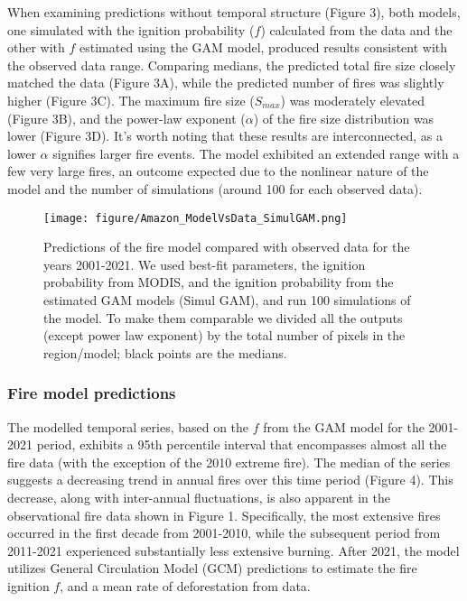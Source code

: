 \documentclass[
]{article}
\begin{document}
When examining predictions without temporal structure (Figure 3), both
models, one simulated with the ignition probability (\(f\)) calculated
from the data and the other with \(f\) estimated using the GAM model,
produced results consistent with the observed data range. Comparing
medians, the predicted total fire size closely matched the data (Figure
3A), while the predicted number of fires was slightly higher (Figure
3C). The maximum fire size (\(S_{max}\)) was moderately elevated (Figure
3B), and the power-law exponent (\(\alpha\)) of the fire size
distribution was lower (Figure 3D). It's worth noting that these results
are interconnected, as a lower \(\alpha\) signifies larger fire events.
The model exhibited an extended range with a few very large fires, an
outcome expected due to the nonlinear nature of the model and the number
of simulations (around 100 for each observed data).

\begin{figure}
\centering
\texttt{[image: figure/Amazon\_ModelVsData\_SimulGAM.png]}
\caption{Predictions of the fire model compared with observed data for
the years 2001-2021. We used best-fit parameters, the ignition
probability from MODIS, and the ignition probability from the estimated
GAM models (Simul GAM), and run 100 simulations of the model. To make
them comparable we divided all the outputs (except power law exponent)
by the total number of pixels in the region/model; black points are the
medians.}
\end{figure}

\subsubsection{Fire model predictions}\label{fire-model-predictions}

The modelled temporal series, based on the \(f\) from the GAM model for
the 2001-2021 period, exhibits a 95th percentile interval that
encompasses almost all the fire data (with the exception of the 2010
extreme fire). The median of the series suggests a decreasing trend in
annual fires over this time period (Figure 4). This decrease, along with
inter-annual fluctuations, is also apparent in the observational fire
data shown in Figure 1. Specifically, the most extensive fires occurred
in the first decade from 2001-2010, while the subsequent period from
2011-2021 experienced substantially less extensive burning. After 2021,
the model utilizes General Circulation Model (GCM) predictions to
estimate the fire ignition \(f\), and a mean rate of deforestation from
data.
\end{document}
